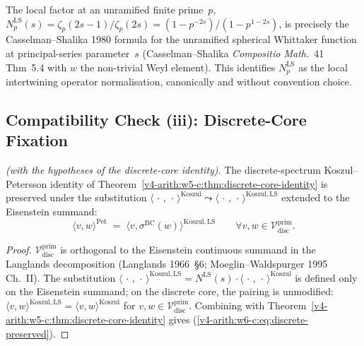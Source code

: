 \begin{remark}
\label{v4-arith:w6-c:rem:casselman-shalika}
The local factor at an unramified finite prime~\(p\),
\(N^{\mathrm{LS}}_{p}(s)=\zeta_{p}(2s-1)/\zeta_{p}(2s)=(1-p^{-2s})/(1-p^{1-2s})\),
is precisely the Casselman--Shalika 1980 formula for the
unramified spherical Whittaker function at principal-series
parameter~\(s\) (Casselman--Shalika \emph{Compositio Math.}~41
Thm~5.4 with \(w\) the non-trivial Weyl element). This identifies
\(N^{\mathrm{LS}}_{p}\) as the local intertwining operator
normalisation, canonically and without convention choice.
\end{remark}

\subsection{Compatibility Check (iii): Discrete-Core Fixation}
\label{v4-arith:w6-c:LS:compat-discrete}

\begin{proposition}
\label{v4-arith:w6-c:prop:discrete-fixation}
\emph{(with the hypotheses of the
discrete-core identity)}. The discrete-spectrum Koszul--Petersson
identity of
Theorem~\ref{v4-arith:w5-c:thm:discrete-core-identity}
is preserved under the substitution
\(\langle\,\cdot\,,\,\cdot\,\rangle^{\mathrm{Koszul}}\leadsto
\langle\,\cdot\,,\,\cdot\,\rangle^{\mathrm{Koszul},\mathrm{LS}}\)
extended to the Eisenstein summand:
\begin{equation}
\label{v4-arith:w6-c:eq:discrete-preserved}
\langle v,w\rangle^{\mathrm{Pet}}\;=\;\langle v,\sigma^{\mathrm{BC}}(w)\rangle^{\mathrm{Koszul},\mathrm{LS}}\qquad\forall v,w\in\mathcal{V}^{\mathrm{prim}}_{\mathrm{disc}}.
\end{equation}
\end{proposition}

\begin{proof}
\(\mathcal{V}^{\mathrm{prim}}_{\mathrm{disc}}\) is orthogonal to the
Eisenstein continuous summand in the Langlands decomposition
(Langlands 1966~\S6; Moeglin--Waldspurger 1995 Ch.~II). The
substitution
\(\langle\,\cdot\,,\,\cdot\,\rangle^{\mathrm{Koszul},\mathrm{LS}}=N^{\mathrm{LS}}(s)\cdot\langle\,\cdot\,,\,\cdot\,\rangle^{\mathrm{Koszul}}\)
is defined only on the Eisenstein summand; on the discrete core,
the pairing is unmodified:
\(\langle v,w\rangle^{\mathrm{Koszul},\mathrm{LS}}=\langle v,w\rangle^{\mathrm{Koszul}}\)
for \(v,w\in\mathcal{V}^{\mathrm{prim}}_{\mathrm{disc}}\).
Combining with Theorem~\ref{v4-arith:w5-c:thm:discrete-core-identity}
gives (\ref{v4-arith:w6-c:eq:discrete-preserved}).
\end{proof}

